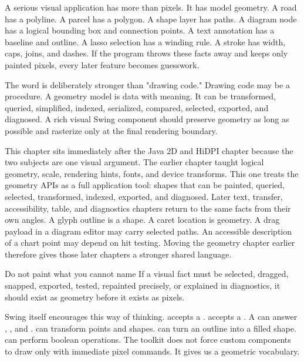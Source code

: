 A serious visual application has more than pixels. It has model geometry. A road has a polyline. A parcel has a polygon. A shape layer has paths. A diagram node has a logical bounding box and connection points. A text annotation has a baseline and outline. A lasso selection has a winding rule. A stroke has width, caps, joins, and dashes. If the program throws these facts away and keeps only painted pixels, every later feature becomes guesswork.

The word  is deliberately stronger than "drawing code." Drawing code may be a procedure. A geometry model is data with meaning. It can be transformed, queried, simplified, indexed, serialized, compared, selected, exported, and diagnosed. A rich visual Swing component should preserve geometry as long as possible and rasterize only at the final rendering boundary.

This chapter sits immediately after the Java 2D and HiDPI chapter because the
two subjects are one visual argument. The earlier chapter taught logical
geometry, scale, rendering hints, fonts, and device transforms. This one treats
the geometry APIs as a full application tool: shapes that can be painted,
queried, selected, transformed, indexed, exported, and diagnosed. Later text,
transfer, accessibility, table, and diagnostics chapters return to the same
facts from their own angles. A glyph outline is a shape. A caret location is
geometry. A drag payload in a diagram editor may carry selected paths. An
accessible description of a chart point may depend on hit testing. Moving the
geometry chapter earlier therefore gives those later chapters a stronger shared
language.

\begin{principlebox}{Do not paint what you cannot name}
If a visual fact must be selected, dragged, snapped, exported, tested, repainted precisely, or explained in diagnostics, it should exist as geometry before it exists as pixels.
\end{principlebox}

Swing itself encourages this way of thinking.  accepts a .  accepts a . A  can answer , , and .  can transform points and shapes.  can turn an outline into a filled shape.  can perform boolean operations. The toolkit does not force custom components to draw only with immediate pixel commands. It gives us a geometric vocabulary.

